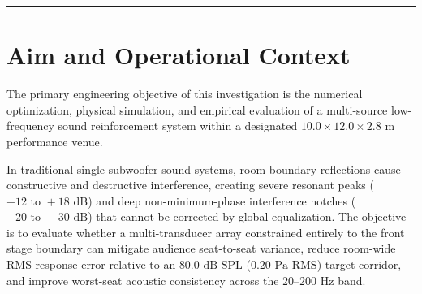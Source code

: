\documentclass[11pt,a4paper]{article}
\begin{document}
\vspace{0.5em}
\hrule
\vspace{1.0em}

\section{Aim and Operational Context}

The primary engineering objective of this investigation is the numerical optimization, physical simulation, and empirical evaluation of a multi-source low-frequency sound reinforcement system within a designated $10.0 \times 12.0 \times 2.8\text{ m}$ performance venue. 

In traditional single-subwoofer sound systems, room boundary reflections cause constructive and destructive interference, creating severe resonant peaks ($+12\text{ to }+18\text{ dB}$) and deep non-minimum-phase interference notches ($-20\text{ to }-30\text{ dB}$) that cannot be corrected by global equalization. The objective is to evaluate whether a multi-transducer array constrained entirely to the front stage boundary can mitigate audience seat-to-seat variance, reduce room-wide RMS response error relative to an $80.0\text{ dB SPL}$ ($0.20\text{ Pa RMS}$) target corridor, and improve worst-seat acoustic consistency across the $20\text{--}200\text{ Hz}$ band.
\end{document}

